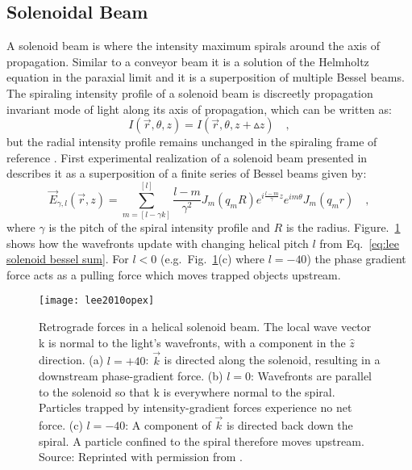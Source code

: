 \subsection{Solenoidal Beam}
A solenoid beam is where the intensity maximum spirals around the axis of propagation. Similar to a conveyor beam it is a solution of the Helmholtz equation in the paraxial limit and it is a superposition of multiple Bessel beams. The spiraling intensity profile of a solenoid beam is discreetly propagation invariant mode of light along its axis of propagation, which can be written as:
\begin{equation}
\label{eq:discreet propagation invariant}
I\left(\vec{r},\theta, z\right) = I\left(\vec{r},\theta, z+\vartriangle z\right) \quad ,
\end{equation}
but the radial intensity profile remains unchanged in the spiraling frame of reference \cite{Tervo01}. First experimental realization of a solenoid beam presented in \cite{Lee:10} describes it as a superposition of a finite series of Bessel beams given by:
\begin{equation}
\label{eq:lee solenoid bessel sum}
\vec{E}_{\gamma, l}(\vec{r},z) = \sum ^{[l]}_{m=[l-\gamma k]}\frac{l-m}{\gamma ^2}J_{m}(q_m R)e^{i\frac{l-m}{\gamma}z}e^{im\theta}J_{m}(q_m r) \quad ,
\end{equation}
where $\gamma$ is the pitch of the spiral intensity profile and $R$ is the radius. Figure.~\ref{fig:solenoid wavefronts} shows how the wavefronts update with changing helical pitch $l$ from Eq.~\eqref{eq:lee solenoid bessel sum}. For $l<0$ (e.g.~Fig.~\ref{fig:solenoid wavefronts}(c) where $l=-40$) the phase gradient force acts as a pulling force which moves trapped objects upstream.
\begin{figure}[t!]
  \centering
  \texttt{[image: lee2010opex]}
  \caption{Retrograde forces in a helical solenoid beam. The local wave vector k is normal to the light's wavefronts, with a component in the $\hat{z}$ direction. (a) $l = +40$: $\vec{k}$ is directed along the solenoid, resulting in a downstream phase-gradient force. (b) $l = 0$: Wavefronts are parallel to the solenoid so that k is everywhere normal to the spiral. Particles trapped by intensity-gradient forces experience no net force. (c) $l = -40$: A component of $\vec{k}$ is directed back down the spiral. A particle confined to the spiral therefore moves upstream. Source: Reprinted with permission from \cite{Lee:10}.}
  \label{fig:solenoid wavefronts}
\end{figure}
